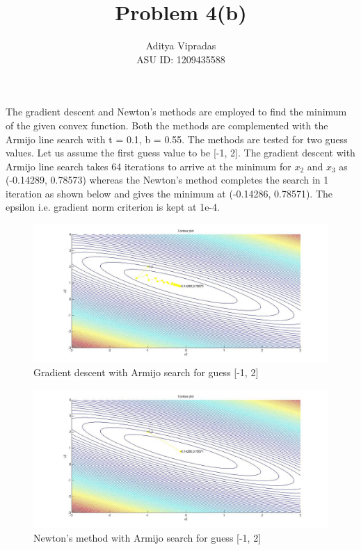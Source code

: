 \documentclass[12pt]{article}
\title{\textbf{Problem 4(b)}}
\author{Aditya Vipradas\\ASU ID: 1209435588}
\begin{document}
\maketitle
The gradient descent and Newton's methods are employed to find the minimum of the given convex function. Both the methods are complemented with the Armijo line search with t = 0.1, b = 0.55. The methods are tested for two guess values. Let us assume the first guess value to be [-1, 2]. The gradient descent with Armijo line search takes 64 iterations to arrive at the minimum for $x_{2}$ and $x_{3}$ as (-0.14289, 0.78573) whereas the Newton's method completes the search in 1 iteration as shown below and gives the minimum at (-0.14286, 0.78571). The epsilon i.e. gradient norm criterion is kept at 1e-4.
\begin{figure}[H]
\begin{center}
\includegraphics[scale=0.375]{contour2g.jpg}
\caption{Gradient descent with Armijo search for guess [-1, 2]}  
\end{center}
\end{figure}
\begin{figure}[H]
\begin{center}
\includegraphics[scale=0.375]{contour2n.jpg}
\caption{Newton's method with Armijo search for guess [-1, 2]}  
\end{center}
\end{figure}
\end{document}
